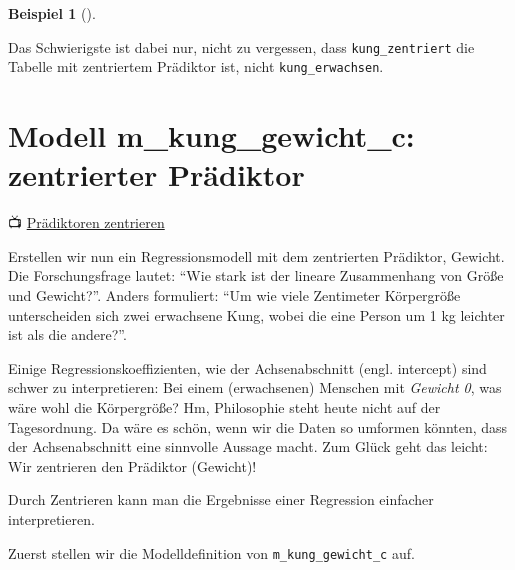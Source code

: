 \documentclass[
  ngerman,
  letterpaper,
  twoside,
  open=any]{scrbook}
\theoremstyle{definition}
\newtheorem{example}{Beispiel}[chapter]
\theoremstyle{plain}
\theoremstyle{definition}
\theoremstyle{definition}
\theoremstyle{remark}
\begin{document}
\begin{example}[]
\begin{figure}[H]
\end{figure}%

Das Schwierigste ist dabei nur, nicht zu vergessen, dass
\texttt{kung\_zentriert} die Tabelle mit zentriertem Prädiktor ist,
nicht \texttt{kung\_erwachsen}.

\section{Modell m\_kung\_gewicht\_c: zentrierter
Prädiktor}\label{modell-m_kung_gewicht_c-zentrierter-pruxe4diktor}

📺 \href{https://youtu.be/3Z1dXPO_MSE}{Prädiktoren zentrieren}

Erstellen wir nun ein Regressionsmodell mit dem zentrierten Prädiktor,
Gewicht. Die Forschungsfrage lautet: \enquote{Wie stark ist der lineare
Zusammenhang von Größe und Gewicht?}. Anders formuliert: \enquote{Um wie
viele Zentimeter Körpergröße unterscheiden sich zwei erwachsene Kung,
wobei die eine Person um 1 kg leichter ist als die andere?}.

Einige Regressionskoeffizienten, wie der Achsenabschnitt (engl.
intercept) sind schwer zu interpretieren: Bei einem (erwachsenen)
Menschen mit \emph{Gewicht 0}, was wäre wohl die Körpergröße? Hm,
Philosophie steht heute nicht auf der Tagesordnung. Da wäre es schön,
wenn wir die Daten so umformen könnten, dass der Achsenabschnitt eine
sinnvolle Aussage macht. Zum Glück geht das leicht: Wir zentrieren den
Prädiktor (Gewicht)!

\begin{tcolorbox}[enhanced jigsaw, arc=.35mm, bottomrule=.15mm, bottomtitle=1mm, breakable, colback=white, colbacktitle=quarto-callout-important-color!10!white, colframe=quarto-callout-important-color-frame, coltitle=black, left=2mm, leftrule=.75mm, opacityback=0, opacitybacktitle=0.6, rightrule=.15mm, title=\textcolor{quarto-callout-important-color}{\faExclamation}\hspace{0.5em}{Wichtig}, titlerule=0mm, toprule=.15mm, toptitle=1mm]

Durch Zentrieren kann man die Ergebnisse einer Regression einfacher
interpretieren.

\end{tcolorbox}

Zuerst stellen wir die Modelldefinition von \texttt{m\_kung\_gewicht\_c}
auf.


\end{example}
\end{document}
